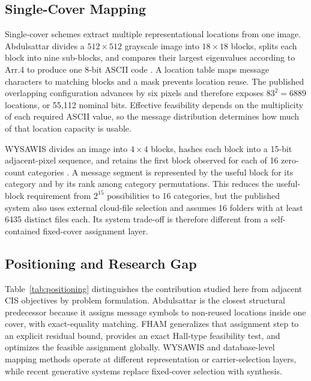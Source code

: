 \documentclass[preprint,12pt]{elsarticle}
\theoremstyle{plain}
\providecommand{\DIFaddtex}[1]{{\protect\color{blue} \sf #1}} %
\providecommand{\DIFdeltex}[1]{{\protect\color{red} \scriptsize #1}} %
\providecommand{\DIFaddbegin}{} %
\providecommand{\DIFaddend}{} %
\providecommand{\DIFdelbegin}{} %
\providecommand{\DIFdelend}{} %
\providecommand{\DIFadd}[1]{\texorpdfstring{\DIFaddtex{#1}}{#1}} %
\providecommand{\DIFdel}[1]{\texorpdfstring{\DIFdeltex{#1}}{}} %
\providecommand{\DIFscaledelfig}{0.5}
\newlength{\DIFdelgraphicswidth} %
\newlength{\DIFdelgraphicsheight} %
\providecommand{\DIFaddincludegraphics}[2][]{{\color{blue}\fbox{\DIFOincludegraphics[#1]{#2}}}} %
\providecommand{\DIFdelincludegraphics}[2][]{%
\sbox{\DIFdelgraphicsbox}{\DIFOincludegraphics[#1]{#2}}%
\settoboxwidth{\DIFdelgraphicswidth}{\DIFdelgraphicsbox} %
\settoboxtotalheight{\DIFdelgraphicsheight}{\DIFdelgraphicsbox} %
\scalebox{\DIFscaledelfig}{%
\parbox[b]{\DIFdelgraphicswidth}{\usebox{\DIFdelgraphicsbox}\\[-\baselineskip] \rule{\DIFdelgraphicswidth}{0em}}\llap{\resizebox{\DIFdelgraphicswidth}{\DIFdelgraphicsheight}{%
\setlength{\unitlength}{\DIFdelgraphicswidth}%
\begin{picture}(1,1)%
\thicklines\linethickness{2pt} %
{\color[rgb]{1,0,0}\put(0,0){\framebox(1,1){}}}%
{\color[rgb]{1,0,0}\put(0,0){\line( 1,1){1}}}%
{\color[rgb]{1,0,0}\put(0,1){\line(1,-1){1}}}%
\end{picture}%
}\hspace*{3pt}}} %
} %
\DeclareRobustCommand{\DIFaddbegin}{\DIFOaddbegin \let\includegraphics\DIFaddincludegraphics} %
\DeclareRobustCommand{\DIFaddend}{\DIFOaddend \let\includegraphics\DIFOincludegraphics} %
\DeclareRobustCommand{\DIFdelbegin}{\DIFOdelbegin \let\includegraphics\DIFdelincludegraphics} %
\DeclareRobustCommand{\DIFdelend}{\DIFOaddend \let\includegraphics\DIFOincludegraphics} %
\renewcommand{\DIFdel}[1]{}
\renewcommand{\DIFdelincludegraphics}[2][]{}
\begin{document}
\subsection{Single-Cover Mapping}
Single-cover schemes extract multiple representational locations from one image. Abdulsattar divides a $512\times512$ grayscale image into $18\times18$ blocks, splits each block into nine sub-blocks, and compares their largest eigenvalues according to Arr.4 to produce one 8-bit ASCII code \cite{abdulsattar2021}. A location table maps message characters to matching blocks and a mask prevents location reuse. The published overlapping configuration advances by six pixels and therefore exposes $83^2=6889$ locations, or 55,112 nominal bits. Effective feasibility \DIFdelbegin \DIFdel{nevertheless }\DIFdelend depends on the multiplicity of each required ASCII value, so \DIFdelbegin \DIFdel{a large location count does not guarantee that a particular message can be assigned}\DIFdelend \DIFaddbegin \DIFadd{the message distribution determines how much of that location capacity is usable}\DIFaddend .

WYSAWIS divides an image into $4\times4$ blocks, hashes each block into a 15-bit adjacent-pixel sequence, and retains the first block observed for each of 16 zero-count categories \cite{wysawis2024}. A message segment is represented by the useful block for its category and by its rank among category permutations. This reduces the useful-block requirement from $2^{15}$ possibilities to 16 categories, but the published system also uses external cloud-file selection and assumes 16 folders with at least 6435 distinct files each. Its system trade-off is therefore different from a self-contained fixed-cover assignment layer.

\subsection{Positioning and Research Gap}
Table~\ref{tab:positioning} distinguishes the contribution studied here from adjacent CIS objectives by problem formulation. Abdulsattar is the closest structural predecessor because it assigns message symbols to non-reused locations inside one cover, with exact-equality matching. FHAM generalizes that assignment step to an explicit residual bound, provides an exact Hall-type feasibility test, and optimizes the feasible assignment globally. WYSAWIS and database-level mapping methods operate at different representation or carrier-selection layers, while recent generative systems replace fixed-cover selection with synthesis.
\end{document}
